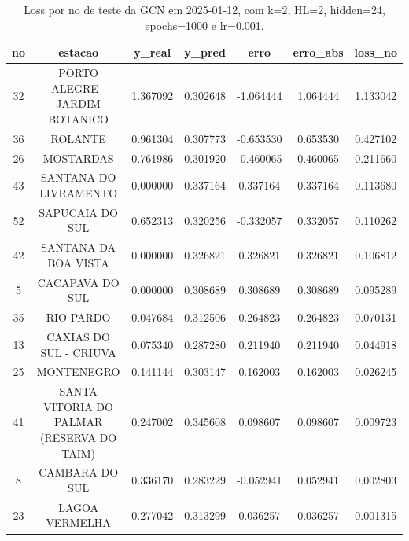 \begin{table}[h]
\centering
\caption{Loss por no de teste da GCN em 2025-01-12, com k=2, HL=2, hidden=24, epochs=1000 e lr=0.001.}
\label{tab:gcn_loss_k2_hl2_h24_e1000_d20250112}
\begin{tabular}{ccccccc}
\toprule
no & estacao & y\_real & y\_pred & erro & erro\_abs & loss\_no \\
\midrule
32 & PORTO ALEGRE - JARDIM BOTANICO & 1.367092 & 0.302648 & -1.064444 & 1.064444 & 1.133042 \\
36 & ROLANTE & 0.961304 & 0.307773 & -0.653530 & 0.653530 & 0.427102 \\
26 & MOSTARDAS & 0.761986 & 0.301920 & -0.460065 & 0.460065 & 0.211660 \\
43 & SANTANA DO LIVRAMENTO & 0.000000 & 0.337164 & 0.337164 & 0.337164 & 0.113680 \\
52 & SAPUCAIA DO SUL & 0.652313 & 0.320256 & -0.332057 & 0.332057 & 0.110262 \\
42 & SANTANA DA BOA VISTA & 0.000000 & 0.326821 & 0.326821 & 0.326821 & 0.106812 \\
5 & CACAPAVA DO SUL & 0.000000 & 0.308689 & 0.308689 & 0.308689 & 0.095289 \\
35 & RIO PARDO & 0.047684 & 0.312506 & 0.264823 & 0.264823 & 0.070131 \\
13 & CAXIAS DO SUL - CRIUVA & 0.075340 & 0.287280 & 0.211940 & 0.211940 & 0.044918 \\
25 & MONTENEGRO & 0.141144 & 0.303147 & 0.162003 & 0.162003 & 0.026245 \\
41 & SANTA VITORIA DO PALMAR (RESERVA DO TAIM) & 0.247002 & 0.345608 & 0.098607 & 0.098607 & 0.009723 \\
8 & CAMBARA DO SUL & 0.336170 & 0.283229 & -0.052941 & 0.052941 & 0.002803 \\
23 & LAGOA VERMELHA & 0.277042 & 0.313299 & 0.036257 & 0.036257 & 0.001315 \\
\bottomrule
\end{tabular}
\end{table}
